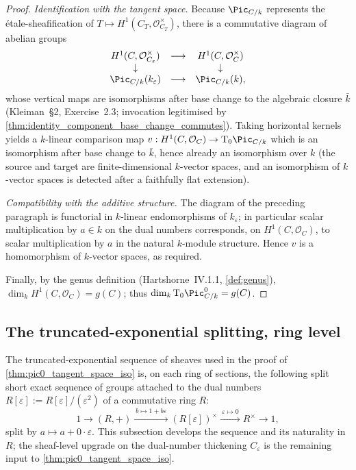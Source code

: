 \begin{proof}
  \emph{Identification with the tangent space.} Because \(\Pic_{C/k}\)
  represents the étale-sheafification of
  \(T \mapsto H^1(C_T, \mathcal{O}_{C_T}^{\times})\), there is a
  commutative diagram of abelian groups
  \[
    \begin{array}{ccc}
      H^1(C, \mathcal{O}_{C_\varepsilon}^{\times}) &
        \longrightarrow & H^1(C, \mathcal{O}_C^{\times}) \\
      \downarrow & & \downarrow \\
      \Pic_{C/k}(k_\varepsilon) & \longrightarrow &
        \Pic_{C/k}(k),
    \end{array}
  \]
  whose vertical maps are isomorphisms after base change to the
  algebraic closure \(\bar k\) (Kleiman~\S 2, Exercise~2.3;
  invocation legitimised by
  \cref{thm:identity_component_base_change_commutes}). Taking horizontal
  kernels yields a \(k\)-linear comparison map
  \(v : H^1(C, \mathcal{O}_C) \to \tu T_0 \Pic_{C/k}\) which is an
  isomorphism after base change to \(\bar k\), hence already an
  isomorphism over \(k\) (the source and target are finite-dimensional
  \(k\)-vector spaces, and an isomorphism of \(k\)-vector spaces is
  detected after a faithfully flat extension).

  \emph{Compatibility with the additive structure.} The diagram of the
  preceding paragraph is functorial in \(k\)-linear endomorphisms of
  \(k_\varepsilon\); in particular scalar multiplication by \(a \in
  k\) on the dual numbers corresponds, on
  \(H^1(C, \mathcal{O}_C)\), to scalar multiplication by \(a\) in the
  natural \(k\)-module structure. Hence \(v\) is a homomorphism of
  \(k\)-vector spaces, as required.

  Finally, by the genus definition (Hartshorne~IV.1.1,
  \cref{def:genus}), \(\dim_k H^1(C, \mathcal{O}_C) = g(C)\); thus
  \(\dim_k \tu T_0 \Pic^0_{C/k} = g(C)\).
\end{proof}

\subsection{The truncated-exponential splitting, ring level}
\label{sec:pic0_trunc_exp}

The truncated-exponential sequence of sheaves used in the proof of
\cref{thm:pic0_tangent_space_iso} is, on each ring of sections, the
following split short exact sequence of groups attached to the dual
numbers \(R[\varepsilon] := R[\varepsilon]/(\varepsilon^2)\) of a
commutative ring \(R\):
\[
  1 \longrightarrow (R, +)
    \xrightarrow{\ b \mapsto 1 + b\varepsilon\ }
    (R[\varepsilon])^{\times}
    \xrightarrow{\ \varepsilon \mapsto 0\ }
    R^{\times} \longrightarrow 1,
\]
split by \(a \mapsto a + 0\cdot\varepsilon\). This subsection develops
the sequence and its naturality in \(R\); the sheaf-level upgrade on the
dual-number thickening \(C_\varepsilon\) is the remaining input to
\cref{thm:pic0_tangent_space_iso}.

